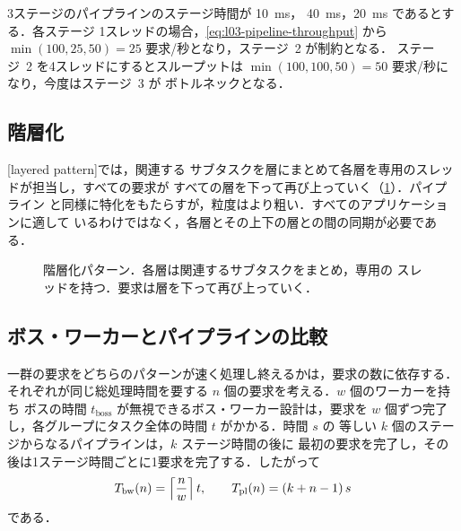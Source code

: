 \documentclass[../main.tex]{subfiles}
\begin{document}
\begin{example}
  3ステージのパイプラインのステージ時間が \SI{10}{\milli\second}，
  \SI{40}{\milli\second}，\SI{20}{\milli\second} であるとする．各ステージ
  1スレッドの場合，\cref{eq:l03-pipeline-throughput} から
  $\min(100, 25, 50) = 25$ \mbox{要求/秒}となり，ステージ~2 が制約となる．
  ステージ~2 を4スレッドにするとスループットは
  $\min(100, 100, 50) = 50$ \mbox{要求/秒}になり，今度はステージ~3 が
  ボトルネックとなる．
\end{example}

\subsection{階層化}

[layered pattern]では，関連する
サブタスクを層にまとめて各層を専用のスレッドが担当し，すべての要求が
すべての層を下って再び上っていく（\cref{fig:l03-layered}）．パイプライン
と同様に特化をもたらすが，粒度はより粗い．すべてのアプリケーションに適して
いるわけではなく，各層とその上下の層との間の同期が必要である．

\begin{figure}[htbp]
  \centering
  
  \caption{階層化パターン．各層は関連するサブタスクをまとめ，専用の
    スレッドを持つ．要求は層を下って再び上っていく．}
  \label{fig:l03-layered}
\end{figure}

\subsection{ボス・ワーカーとパイプラインの比較}

一群の要求をどちらのパターンが速く処理し終えるかは，要求の数に依存する．%
%
それぞれが同じ総処理時間を要する $n$ 個の要求を考える．$w$ 個のワーカーを持ち
ボスの時間 $t_{\mathrm{boss}}$ が無視できるボス・ワーカー設計は，要求を
$w$ 個ずつ完了し，各グループにタスク全体の時間 $t$ がかかる．時間 $s$ の
等しい $k$ 個のステージからなるパイプラインは，$k$ ステージ時間の後に
最初の要求を完了し，その後は1ステージ時間ごとに1要求を完了する．したがって
\begin{equation}
  T_{\mathrm{bw}}(n) = \Bigl\lceil \frac{n}{w} \Bigr\rceil\, t ,
  \qquad
  T_{\mathrm{pl}}(n) = (k + n - 1)\, s
  \label{eq:l03-batch-time}
\end{equation}
である．
\end{document}
